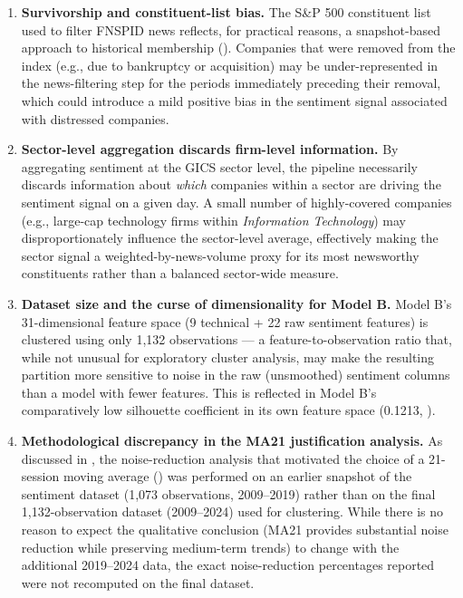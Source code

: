 \begin{enumerate}
  \item \textbf{Survivorship and constituent-list bias.} The S\&P 500
  constituent list used to filter FNSPID news reflects, for practical
  reasons, a snapshot-based approach to historical membership
  (). Companies that were removed from the index
  (e.g., due to bankruptcy or acquisition) may be under-represented in the
  news-filtering step for the periods immediately preceding their removal,
  which could introduce a mild positive bias in the sentiment signal
  associated with distressed companies.

  \item \textbf{Sector-level aggregation discards firm-level information.}
  By aggregating sentiment at the GICS sector level, the pipeline
  necessarily discards information about \emph{which} companies within a
  sector are driving the sentiment signal on a given day. A small number
  of highly-covered companies (e.g., large-cap technology firms within
  \textit{Information Technology}) may disproportionately influence the
  sector-level average, effectively making the sector signal a
  weighted-by-news-volume proxy for its most newsworthy constituents
  rather than a balanced sector-wide measure.

  \item \textbf{Dataset size and the curse of dimensionality for Model B.}
  Model B's 31-dimensional feature space (9 technical + 22 raw sentiment
  features) is clustered using only 1,132 observations --- a
  feature-to-observation ratio that, while not unusual for exploratory
  cluster analysis, may make the resulting partition more sensitive to
  noise in the raw (unsmoothed) sentiment columns than a model with fewer
  features. This is reflected in Model B's comparatively low silhouette
  coefficient in its own feature space (0.1213, ).

  \item \textbf{Methodological discrepancy in the MA21 justification
  analysis.} As discussed in , the noise-reduction
  analysis that motivated the choice of a 21-session moving average
  () was performed on an earlier snapshot of
  the sentiment dataset (1,073 observations, 2009--2019) rather than on the
  final 1,132-observation dataset (2009--2024) used for clustering. While
  there is no reason to expect the qualitative conclusion (MA21 provides
  substantial noise reduction while preserving medium-term trends) to
  change with the additional 2019--2024 data, the exact noise-reduction
  percentages reported were not recomputed on the final dataset.


\end{enumerate}
